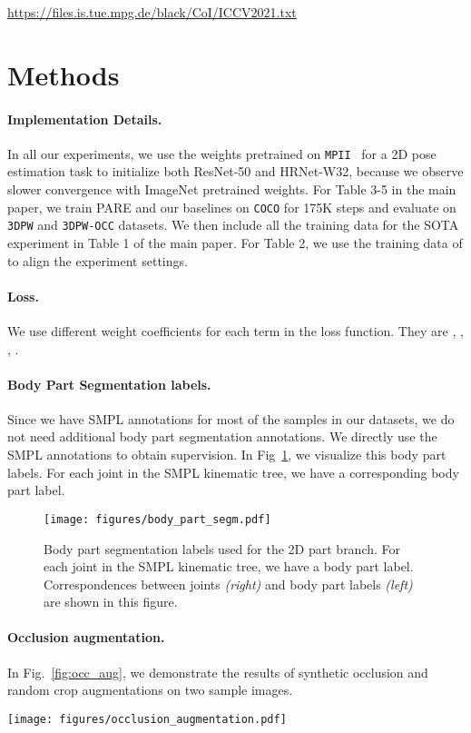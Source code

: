 \documentclass[10pt,twocolumn,letterpaper,usenames,dvipsnames]{article}
\newcommand{\mpii}{\texttt{MPII}\xspace}
\newcommand{\threedpw}{\texttt{3DPW}\xspace}
\newcommand{\threedpwocc}{\texttt{3DPW-OCC}\xspace}
\newcommand{\coco}{\texttt{COCO}\xspace}
\begin{document}
 \url{https://files.is.tue.mpg.de/black/CoI/ICCV2021.txt} \section{Methods}
\paragraph{Implementation Details.}
In all our experiments, we use the weights pretrained on \mpii~\cite{mpii} for a 2D pose estimation task to initialize both ResNet-50 and HRNet-W32, because we observe slower convergence with ImageNet pretrained weights. 
For Table 3-5 in the main paper, we train PARE and our baselines on \coco for 175K steps and evaluate on \threedpw and \threedpwocc datasets. We then include all the training data for the SOTA experiment in Table 1 of the main paper. 
For Table 2, we use the training data of \cite{zhangoohcvpr20} to align the experiment settings.

\paragraph{Loss.}
We use different weight coefficients  for each term in the loss function. They are , , , .

\paragraph{Body Part Segmentation labels.}
Since we have SMPL annotations for most of the samples in our datasets, we do not need additional body part segmentation annotations. We directly use the SMPL annotations to obtain supervision. In Fig~\ref{fig:segmentation}, we visualize this body part labels. For each joint in the SMPL kinematic tree, we have a corresponding body part label.

\begin{figure}[t]
	\centering
	\texttt{[image: figures/body\_part\_segm.pdf]}
\caption{Body part segmentation labels used for the 2D part branch. For each joint in the SMPL kinematic tree, we have a body part label. Correspondences between joints \textit{(right)} and body part labels \textit{(left)} are shown in this figure.}
	\label{fig:segmentation}
\end{figure}{}

\paragraph{Occlusion augmentation.}
In Fig.~\ref{fig:occ_aug}, we demonstrate the results of synthetic occlusion and random crop augmentations on two sample images. 
\begin{figure*}[t]
	\centering
	\texttt{[image: figures/occlusion\_augmentation.pdf]}
	\caption{Training samples after synthetic occlusion and random crop augmentations are applied.}
	\label{fig:occ_aug}
\end{figure*}{}
\end{document}
